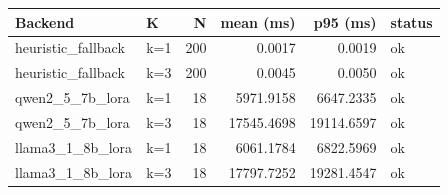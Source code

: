\begin{tabular}{llrrrl}
\toprule
Backend & K & N & mean (ms) & p95 (ms) & status \\
\midrule
heuristic\_fallback & k=1 & 200 & 0.0017 & 0.0019 & ok \\
heuristic\_fallback & k=3 & 200 & 0.0045 & 0.0050 & ok \\
qwen2\_5\_7b\_lora & k=1 & 18 & 5971.9158 & 6647.2335 & ok \\
qwen2\_5\_7b\_lora & k=3 & 18 & 17545.4698 & 19114.6597 & ok \\
llama3\_1\_8b\_lora & k=1 & 18 & 6061.1784 & 6822.5969 & ok \\
llama3\_1\_8b\_lora & k=3 & 18 & 17797.7252 & 19281.4547 & ok \\
\bottomrule
\end{tabular}
